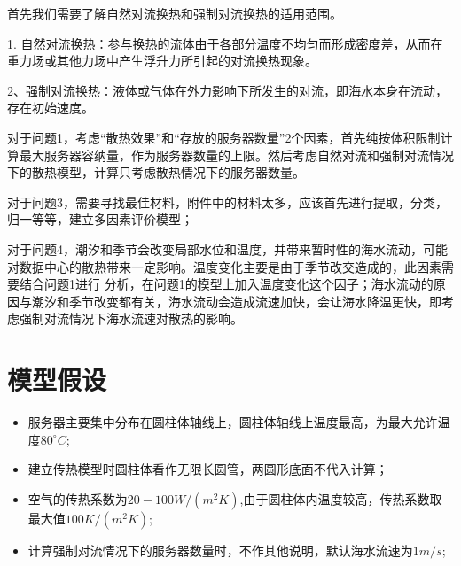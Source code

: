 \documentclass{article}
\begin{document}
	首先我们需要了解自然对流换热和强制对流换热的适用范围。
	
	1. 自然对流换热：参与换热的流体由于各部分温度不均匀而形成密度差，从而在重力场或其他力场中产生浮升力所引起的对流换热现象。
	
	2、强制对流换热：液体或气体在外力影响下所发生的对流，即海水本身在流动，存在初始速度。
	
	对于问题1，考虑“散热效果”和“存放的服务器数量”2个因素，首先纯按体积限制计算最大服务器容纳量，作为服务器数量的上限。然后考虑自然对流和强制对流情况下的散热模型，计算只考虑散热情况下的服务器数量。
	
	对于问题3，需要寻找最佳材料，附件中的材料太多，应该首先进行提取，分类，归一等等，建立多因素评价模型；
	
	对于问题4，潮汐和季节会改变局部水位和温度，并带来暂时性的海水流动，可能对数据中心的散热带来一定影响。温度变化主要是由于季节改交造成的，此因素需要结合问题1进行
	分析，在问题1的模型上加入温度变化这个因子；海水流动的原因与潮汐和季节改变都有关，海水流动会造成流速加快，会让海水降温更快，即考虑强制对流情况下海水流速对散热的影响。
	
	
	
	\section{模型假设}
		\begin{itemize}
			\item 服务器主要集中分布在圆柱体轴线上，圆柱体轴线上温度最高，为最大允许温度$80^\circ C$;
			\item 建立传热模型时圆柱体看作无限长圆管，两圆形底面不代入计算；
			
			\item 空气的传热系数为$20-100 W/(m^{2} K)$,由于圆柱体内温度较高，传热系数取最大值$100 K/(m^{2 } K)$;
			\item 计算强制对流情况下的服务器数量时，不作其他说明，默认海水流速为$1 m/s$;
		\end{itemize}	
	
\end{document}
